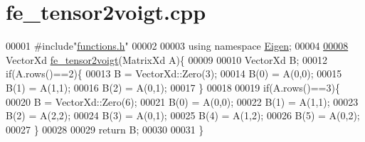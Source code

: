 \hypertarget{fe__tensor2voigt_8cpp_source}{}\section{fe\+\_\+tensor2voigt.\+cpp}
\label{fe__tensor2voigt_8cpp_source}

\begin{DoxyCode}
00001 \textcolor{preprocessor}{#include"\hyperlink{functions_8h}{functions.h}"}
00002 
00003 \textcolor{keyword}{using namespace }\hyperlink{namespace_eigen}{Eigen};
00004 
\hyperlink{fe__tensor2voigt_8cpp_a73c4523ec7068af2af9e8431021f5fdf}{00008} VectorXd \hyperlink{fe__tensor2voigt_8cpp_a73c4523ec7068af2af9e8431021f5fdf}{fe\_tensor2voigt}(MatrixXd A)\{
00009 
00010   VectorXd B; 
00012   \textcolor{keywordflow}{if}(A.rows()==2)\{
00013     B = VectorXd::Zero(3);
00014     B(0) = A(0,0);
00015     B(1) = A(1,1);
00016     B(2) = A(0,1);
00017   \}
00018 
00019   \textcolor{keywordflow}{if}(A.rows()==3)\{
00020     B = VectorXd::Zero(6);
00021     B(0) = A(0,0);
00022     B(1) = A(1,1);
00023     B(2) = A(2,2);
00024     B(3) = A(0,1);
00025     B(4) = A(1,2);
00026     B(5) = A(0,2);
00027   \}
00028 
00029   \textcolor{keywordflow}{return} B;
00030 
00031 \}
\end{DoxyCode}
